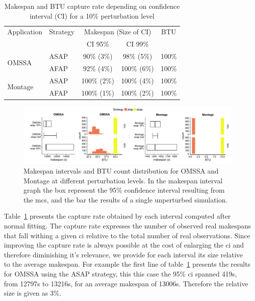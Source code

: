 \documentclass[10pt,conference,compsocconf]{IEEEtran}
\begin{document}
\begin{table}
	\centering
	\caption{Makespan and BTU capture rate depending on confidence interval
          (CI) for a 10\% perturbation level}\label{tab:fit}
	\begin{tabular}{llccc}
		\toprule
		Application&Strategy&\multicolumn{2}{c}{Makespan (Size of CI)}&BTU\\
                           &         & CI 95\% & CI 99\% &\\
		\midrule
		\multirow{2}{*}{OMSSA}&ASAP&  90\% (3\%)&  98\% (5\%)& 100\%\\
				      &AFAP&  92\% (4\%)& 100\% (6\%)& 100\%\\
		\midrule
		\multirow{2}{*}{Montage}&ASAP& 100\% (2\%)& 100\% (4\%)& 100\%\\
					&AFAP& 100\% (1\%)& 100\% (2\%)& 100\%\\
		\bottomrule
	\end{tabular}
\end{table}
\begin{figure}
	\includegraphics[width=\textwidth]{gfx/int_plot.pdf}
	\caption{Makespan intervals and BTU count distribution for OMSSA and 
	Montage at different perturbation levels. In the makespan interval graph 
	the box represent the 95\% confidence interval resulting from the \acs{mcs},
	and the bar the results of a single unperturbed simulation.}\label{fig:int}
\end{figure}

Table~\ref{tab:fit} presents the capture rate obtained by each interval computed
after normal fitting. The capture rate expresses the number of observed real
makespans that fall withing a given \ac{ci} relative to the total number of real
observations. Since improving the capture rate is always possible at the cost of
enlarging the \ac{ci} and therefore diminishing it's relevance, we provide for
each interval its size relative to the average makespan. For example the first
line of table~\ref{tab:fit} presents the results for OMSSA using the ASAP
strategy, this this case the 95\% \ac{ci} spanned 419s, from 12797s to 13216s,
for an average makespan of 13006s. Therefore the relative size is given as 3\%.
\end{document}
